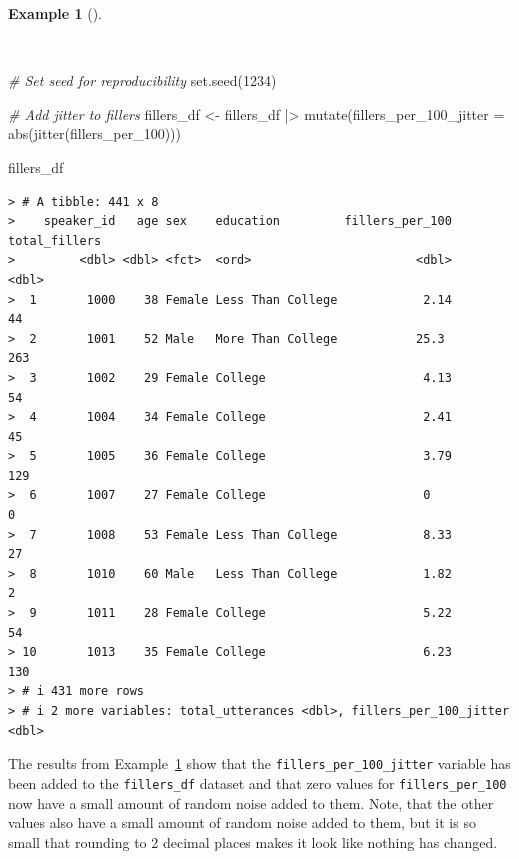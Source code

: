 \documentclass[
  letterpaper,
  DIV=11,
  numbers=noendperiod]{scrreprt}
\newenvironment{Shaded}{\begin{snugshade}}{\end{snugshade}}
\newcommand{\AttributeTok}[1]{\textcolor[rgb]{0.00,0.00,0.00}{#1}}
\newcommand{\CommentTok}[1]{\textcolor[rgb]{0.00,0.00,0.00}{\textit{#1}}}
\newcommand{\DecValTok}[1]{\textcolor[rgb]{0.00,0.00,0.00}{#1}}
\newcommand{\FunctionTok}[1]{\textcolor[rgb]{0.00,0.00,0.00}{#1}}
\newcommand{\NormalTok}[1]{\textcolor[rgb]{0.00,0.00,0.00}{#1}}
\newcommand{\OtherTok}[1]{\textcolor[rgb]{0.00,0.00,0.00}{#1}}
\newcommand{\SpecialCharTok}[1]{\textcolor[rgb]{0.00,0.00,0.00}{#1}}
\theoremstyle{definition}
\newtheorem{example}{Example}[chapter]
\theoremstyle{remark}
\begin{document}
\begin{example}[]\protect\hypertarget{exm-ida-num-uni-jitter}{}\label{exm-ida-num-uni-jitter}

~

\begin{Shaded}
\begin{Highlighting}[]
\CommentTok{\# Set seed for reproducibility}
\FunctionTok{set.seed}\NormalTok{(}\DecValTok{1234}\NormalTok{)}

\CommentTok{\# Add jitter to fillers}
\NormalTok{fillers\_df }\OtherTok{\textless{}{-}}
\NormalTok{  fillers\_df }\SpecialCharTok{|\textgreater{}}
  \FunctionTok{mutate}\NormalTok{(}\AttributeTok{fillers\_per\_100\_jitter =} \FunctionTok{abs}\NormalTok{(}\FunctionTok{jitter}\NormalTok{(fillers\_per\_100)))}

\NormalTok{fillers\_df}
\end{Highlighting}
\end{Shaded}

\begin{verbatim}
> # A tibble: 441 x 8
>    speaker_id   age sex    education         fillers_per_100 total_fillers
>         <dbl> <dbl> <fct>  <ord>                       <dbl>         <dbl>
>  1       1000    38 Female Less Than College            2.14            44
>  2       1001    52 Male   More Than College           25.3            263
>  3       1002    29 Female College                      4.13            54
>  4       1004    34 Female College                      2.41            45
>  5       1005    36 Female College                      3.79           129
>  6       1007    27 Female College                      0                0
>  7       1008    53 Female Less Than College            8.33            27
>  8       1010    60 Male   Less Than College            1.82             2
>  9       1011    28 Female College                      5.22            54
> 10       1013    35 Female College                      6.23           130
> # i 431 more rows
> # i 2 more variables: total_utterances <dbl>, fillers_per_100_jitter <dbl>
\end{verbatim}

\end{example}

The results from Example~\ref{exm-ida-num-uni-jitter} show that the
\texttt{fillers\_per\_100\_jitter} variable has been added to the
\texttt{fillers\_df} dataset and that zero values for
\texttt{fillers\_per\_100} now have a small amount of random noise added
to them. Note, that the other values also have a small amount of random
noise added to them, but it is so small that rounding to 2 decimal
places makes it look like nothing has changed.
\end{document}
